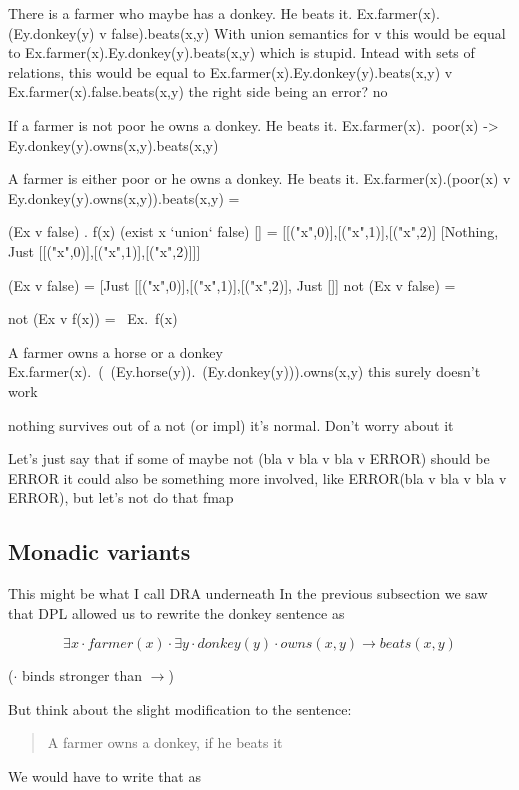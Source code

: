 \documentclass[12pt]{article}
\begin{document}
There is a farmer who maybe has a donkey. He beats it.
Ex.farmer(x).(Ey.donkey(y) v false).beats(x,y)
With union semantics for v this would be equal to
Ex.farmer(x).Ey.donkey(y).beats(x,y)
which is stupid.
Intead with sets of relations, this would be equal to
Ex.farmer(x).Ey.donkey(y).beats(x,y) v Ex.farmer(x).false.beats(x,y)
the right side being an error? no

If a farmer is not poor he owns a donkey. He beats it.
Ex.farmer(x).~poor(x) -> Ey.donkey(y).owns(x,y).beats(x,y)

A farmer is either poor or he owns a donkey. He beats it.
Ex.farmer(x).(poor(x) v Ey.donkey(y).owns(x,y)).beats(x,y) =

(Ex v false) . f(x)
(exist x `union` false) [] = [[("x",0)],[("x",1)],[("x",2)]
[Nothing, Just [[("x",0)],[("x",1)],[("x",2)]]]


(Ex v false) = [Just [[("x",0)],[("x",1)],[("x",2)], Just []]
not (Ex v false) =

not (Ex v f(x))
= ~Ex.~f(x)

A farmer owns a horse or a donkey
Ex.farmer(x).~(~(Ey.horse(y)).~(Ey.donkey(y))).owns(x,y)   this surely doesn't work


nothing survives out of a not (or impl) it's normal. Don't worry about it

Let's just say that if some of 
maybe not (bla v bla v bla v ERROR) should be ERROR
it could also be something more involved, like ERROR(bla v bla v bla v ERROR), but let's not do that
fmap

\subsection{Monadic variants}
This might be what I call DRA underneath
In the previous subsection we saw that DPL allowed us to rewrite the donkey sentence as 

\begin{equation}
\exists x \cdot farmer(x) \cdot \exists y \cdot donkey(y) \cdot owns(x,y) \rightarrow beats(x,y)
\end{equation}

($\cdot$ binds stronger than $\rightarrow$)

But think about the slight modification to the sentence:

\begin{quotation}
A farmer owns a donkey, if he beats it
\end{quotation}

We would have to write that as
\end{document}
